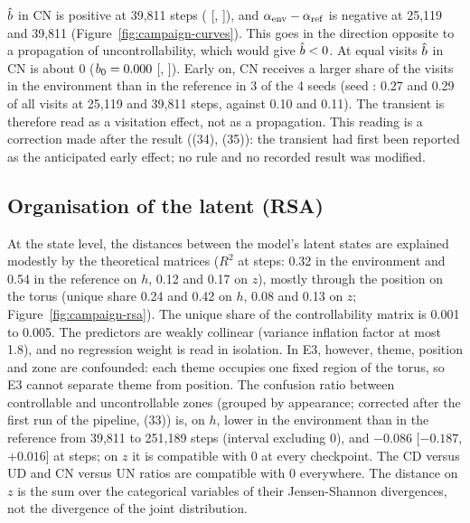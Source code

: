\documentclass[10pt]{article}
\begin{document}
$\hat{b}$ in CN is positive at 39,811 steps (\eThreeCampaignBCNEarlyMean{} [\eThreeCampaignBCNEarlyLow, %
\eThreeCampaignBCNEarlyHigh]), and $\alpha_{\mathrm{env}} - \alpha_{\mathrm{ref}}$ is negative at 25,119 and 39,811 %
(Figure~\ref{fig:campaign-curves}). This goes in the direction opposite to a propagation of uncontrollability, which
would give $\hat{b} < 0$. At equal visits $\hat{b}$ in CN is about 0 ($b_0 = 0.000$ %
[\eThreeCampaignBZeroCNLow, \eThreeCampaignBZeroCNHigh]). Early on, CN receives a larger share of the visits in the
environment than in the reference in 3 of the 4 seeds (seed \eThreeCampaignSeedA: 0.27 and 0.29 of all visits at 25,119 %
and 39,811 steps, against 0.10 and 0.11). The transient is therefore read as a visitation effect, not as a propagation. %
This reading is a correction made after the result ((34), (35)): the transient had first been reported as the %
anticipated early effect; no rule and no recorded result was modified.

\subsection{Organisation of the latent (RSA)}
\label{sec:results-rsa}

At the state level, the distances between the model's latent states are explained modestly by the theoretical
matrices ($R^2$ at \eThreeBudget{} steps: 0.32 in the environment and 0.54 in the reference on $h$, 0.12 and 0.17 on %
$z$), mostly through the position on the torus (unique share 0.24 and 0.42 on $h$, 0.08 and 0.13 on $z$; %
Figure~\ref{fig:campaign-rsa}). The unique share of the controllability matrix is 0.001 to 0.005. The predictors are %
weakly collinear (variance inflation factor at most 1.8), and no regression weight is read in isolation. %
In E3, however, theme, position and zone are confounded: each theme occupies one fixed region of the torus, so E3
cannot separate theme from position.
The confusion ratio between controllable and uncontrollable zones (grouped by appearance; corrected after the first run
of the pipeline, (33)) is, on $h$, lower in the environment than in the reference from 39,811 to 251,189 steps %
(interval excluding 0), and $-0.086$ [$-0.187$, $+0.016$] at \eThreeBudget{} steps; on $z$ it is compatible with 0 at %
every checkpoint. The CD versus UD and CN versus UN ratios are compatible with 0 everywhere. %
The distance on $z$ is the sum over the \eThreeLatentVars{} categorical variables of their Jensen-Shannon divergences,
not the divergence of the joint distribution.
\end{document}
